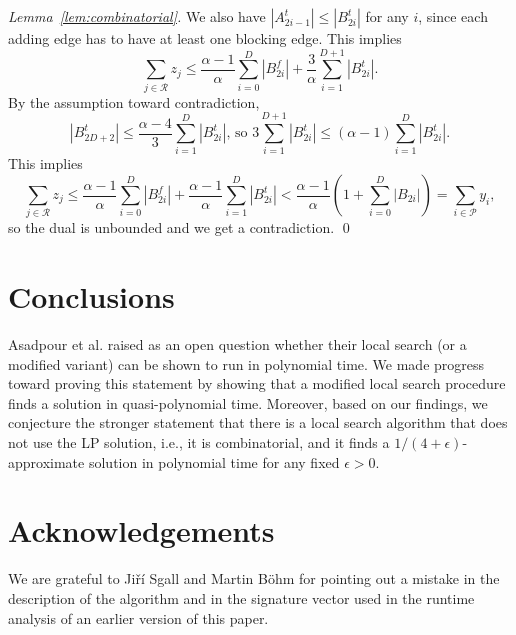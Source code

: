 \documentclass{llncs}
\newcommand{\res}{\ensuremath{\mathcal{R}}\xspace}
\newcommand{\players}{\ensuremath{\mathcal{P}}\xspace}
\begin{document}
\begin{proof}[Lemma~\ref{lem:combinatorial}]
We also have $|A^t_{2i-1}|\leq |B^t_{2i}|$ for any $i$, since each adding edge has to
have at least one blocking edge.
This implies
\begin{equation*}
  \sum_{j\in \res}z_j\leq
  \frac{\alpha-1}{\alpha} \sum_{i=0}^D |B_{2i}^f|
  + \frac{3}{\alpha} \sum_{i=1}^{D+1} |B^t_{2i}|.
\end{equation*}
By the assumption toward contradiction,
\begin{equation*}
  \text{$|B^t_{2D+2}|\leq \frac{\alpha-4}{3} \sum_{i=1}^D |B^t_{2i}|$, so
  $3\sum_{i=1}^{D+1} |B^t_{2i}| \leq (\alpha-1)\sum_{i=1}^D |B^t_{2i}|$.}
\end{equation*}
This implies
\begin{equation*}
  \sum_{j\in \res}z_j\leq
  \frac{\alpha-1}{\alpha} \sum_{i=0}^D|B_{2i}^f|
  + \frac{\alpha-1}{\alpha} \sum_{i=1}^D|B^t_{2i}| <
  \frac{\alpha-1}{\alpha} \left(1+\sum_{i=0}^D |B_{2i}|\right) =
  \sum_{i\in \players} y_i,
\end{equation*}
so the dual is unbounded and we get a contradiction. \qed
\end{proof}

\section{Conclusions}
Asadpour et al. \cite{AFS08} raised as an open question whether their local
search (or a modified variant) can be shown to run in polynomial time. We made
progress toward proving this statement by showing that a modified local search
procedure finds a solution in quasi-polynomial time. Moreover, based on our
findings, we conjecture the stronger statement that there is a local search
algorithm that does not use the LP solution, i.e., it is combinatorial, and it
finds a $1/(4+\epsilon)$-approximate solution in polynomial time for any fixed
$\epsilon >0$.

\section{Acknowledgements}

We are grateful to Ji\v{r}\'{i} Sgall and Martin B\"{o}hm for pointing out a mistake in the description of the
algorithm and in the signature vector used in the runtime analysis  of an earlier version
of this paper.



\end{document}
